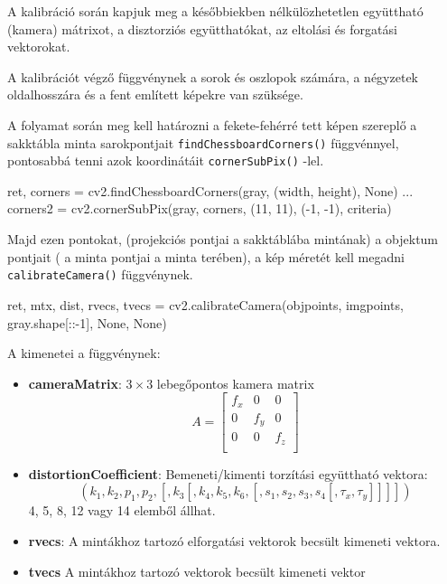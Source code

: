A kalibráció során kapjuk meg a későbbiekben nélkülözhetetlen együttható (kamera) mátrixot, a disztorziós együtthatókat, az eltolási és forgatási vektorokat.

A kalibrációt végző függvénynek a sorok és oszlopok számára, a négyzetek oldalhosszára és a fent említett képekre van szüksége.

A folyamat során meg kell határozni a fekete-fehérré tett képen szereplő a sakktábla minta sarokpontjait
\texttt{findChessboardCorners()} függvénnyel, pontosabbá tenni azok koordinátáit
\texttt{cornerSubPix()} -lel.
\begin{python}
ret, corners = cv2.findChessboardCorners(gray, (width, height), None)
...
corners2 = cv2.cornerSubPix(gray, corners, (11, 11), (-1, -1), criteria)
\end{python}

Majd ezen pontokat, (projekciós pontjai a sakktáblába mintának) a objektum pontjait ( a minta pontjai a minta terében), a kép méretét kell megadni \texttt{calibrateCamera()} függvénynek. \\

\begin{python}
  ret, mtx, dist, rvecs, tvecs = cv2.calibrateCamera(objpoints,
   imgpoints, gray.shape[::-1], None, None)
\end{python}

A kimenetei a függvénynek:
\begin{itemize}
\item {\bf cameraMatrix}: $3 \times 3$ lebegőpontos kamera matrix
\[
A =
\begin{bmatrix}
	f_x & 0 & 0 \\
	0 & f_y & 0 \\
	0 & 0 & f_z \\
\end{bmatrix}
\]

\item {\bf distortionCoefficient}: Bemeneti/kimenti torzítási együttható vektora:
\[
(k_1, k_2, p_1, p_2, [, k_3 [, k_4, k_5, k_6, [, s_1, s_2, s_3, s_4 [, \tau_x, \tau_y]]]])
\]
4, 5, 8, 12 vagy 14 elemből állhat.

\item {\bf rvecs}: A mintákhoz tartozó elforgatási vektorok becsült kimeneti vektora.

\item {\bf tvecs}  A mintákhoz tartozó vektorok becsült kimeneti vektor
\end{itemize}


